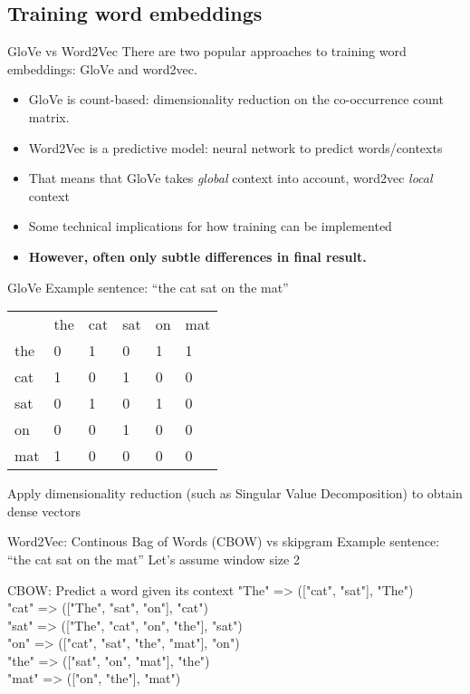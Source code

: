 \subsection{Training word embeddings}

\begin{frame}{GloVe vs Word2Vec}
  There are two popular approaches to training word embeddings: GloVe and word2vec.
  \begin{itemize}
  \item GloVe is count-based: dimensionality reduction on the co-occurrence count matrix.
  \item Word2Vec is a predictive model: neural network to predict words/contexts
  \item That means that GloVe takes \emph{global} context into account, word2vec \emph{local} context
  \item Some technical implications for how training can be implemented 
  \item \textbf{However, often only subtle differences in final result.}
  \end{itemize}
\end{frame}

\begin{frame}{GloVe}
  Example sentence: ``the cat sat on the mat''
  \begin{table}[]
    \begin{tabular}{llllll}
        & the & cat & sat & on & mat \\
    the & 0   & 1   & 0   & 1  & 1   \\
    cat & 1   & 0   & 1   & 0  & 0   \\
    sat & 0   & 1   & 0   & 1  & 0   \\
    on  & 0   & 0   & 1   & 0  & 0   \\
    mat & 1   & 0   & 0   & 0  & 0  
    \end{tabular}
    \end{table}
    Apply dimensionality reduction (such as Singular Value Decomposition) to obtain dense vectors
\end{frame}


\begin{frame}{Word2Vec: Continous Bag of Words (CBOW) vs skipgram}
  Example sentence: ``the cat sat on the mat''
  Let's assume window size 2
  \begin{block}{CBOW: Predict a word given its context}
    "The" => (["cat", "sat"], "The") \\
    "cat" => (["The", "sat", "on"], "cat")\\
    "sat" => (["The", "cat", "on", "the"], "sat")\\
    "on" => (["cat", "sat", "the", "mat"], "on")\\
    "the" => (["sat", "on", "mat"], "the")\\
    "mat" => (["on", "the"], "mat")\\
  \end{block}
\end{frame}
  
